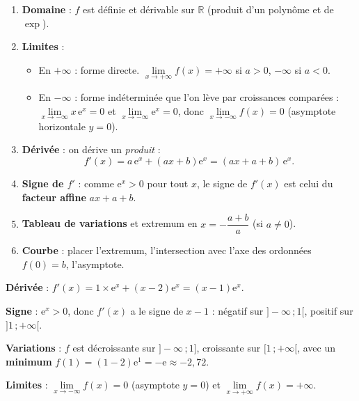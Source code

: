 \documentclass[11pt]{article}
\begin{document}
\begin{methode}[Étudier $f(x) = (ax+b)\mathrm{e}^x$]
\begin{enumerate}
\item \textbf{Domaine} : $f$ est définie et dérivable sur $\mathbb{R}$ (produit d'un polynôme et de $\exp$).
\item \textbf{Limites} :
      \begin{itemize}
      \item En $+\infty$ : forme directe. $\lim\limits_{x \to +\infty} f(x) = +\infty$ si $a > 0$, $-\infty$ si $a < 0$.
      \item En $-\infty$ : forme indéterminée que l'on lève par croissances comparées : $\lim\limits_{x \to -\infty} x\,\mathrm{e}^x = 0$ et $\lim\limits_{x \to -\infty} \mathrm{e}^x = 0$, donc $\lim\limits_{x \to -\infty} f(x) = 0$ (asymptote horizontale $y = 0$).
      \end{itemize}
\item \textbf{Dérivée} : on dérive un \emph{produit} :
\[ f'(x) = a\,\mathrm{e}^x + (ax+b)\mathrm{e}^x = (ax + a + b)\,\mathrm{e}^x. \]
\item \textbf{Signe de $f'$} : comme $\mathrm{e}^x > 0$ pour tout $x$, le signe de $f'(x)$ est celui du \textbf{facteur affine} $ax + a + b$.
\item \textbf{Tableau de variations} et extremum en $x = -\dfrac{a+b}{a}$ (si $a \neq 0$).
\item \textbf{Courbe} : placer l'extremum, l'intersection avec l'axe des ordonnées $f(0) = b$, l'asymptote.
\end{enumerate}
\end{methode}

\begin{exemplebox}[Exemple chiffré : $f(x) = (x-2)\mathrm{e}^x$]
\textbf{Dérivée} : $f'(x) = 1 \times \mathrm{e}^x + (x-2)\mathrm{e}^x = (x - 1)\mathrm{e}^x$.

\textbf{Signe} : $\mathrm{e}^x > 0$, donc $f'(x)$ a le signe de $x - 1$ : négatif sur $]-\infty\,;1[$, positif sur $]1\,;+\infty[$.

\textbf{Variations} : $f$ est décroissante sur $]-\infty\,;1]$, croissante sur $[1\,;+\infty[$, avec un \textbf{minimum} $f(1) = (1-2)\mathrm{e}^1 = -\mathrm{e} \approx -2{,}72$.

\textbf{Limites} : $\lim\limits_{x \to -\infty} f(x) = 0$ (asymptote $y = 0$) et $\lim\limits_{x \to +\infty} f(x) = +\infty$.
\end{exemplebox}
\end{document}
